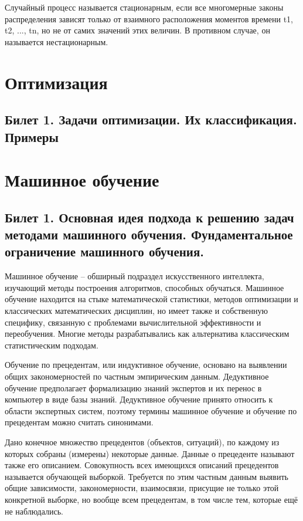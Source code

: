 \documentclass[a4paper, 12pt]{article}
\begin{document}
	Случайный процесс называется стационарным, если все многомерные законы распределения зависят только от взаимного расположения моментов
	времени t1, t2, ..., tn, но не от самих значений этих величин. В противном случае, он называется нестационарным.
	
	\section*{Оптимизация}
	\subsection*{Билет 1. Задачи оптимизации. Их классификация. Примеры}
	\section*{Машинное обучение}
	\subsection*{Билет 1. Основная идея подхода к решению задач методами машинного обучения. Фундаментальное ограничение машинного обучения.}
	Машинное обучение -- обширный подраздел искусственного интеллекта, изучающий методы построения алгоритмов, способных обучаться. Машинное обучение находится на стыке математической статистики, методов оптимизации и классических математических дисциплин, но имеет также и собственную специфику, связанную с проблемами вычислительной эффективности и переобучения. Многие методы разрабатывались как альтернатива классическим статистическим подходам. 
	
	Обучение по прецедентам, или индуктивное обучение, основано на выявлении общих закономерностей по частным эмпирическим данным. Дедуктивное обучение предполагает формализацию знаний экспертов и их перенос в компьютер в виде базы знаний. Дедуктивное обучение принято относить к области экспертных систем, поэтому термины машинное обучение и обучение по прецедентам можно считать синонимами.
	
	Дано конечное множество прецедентов (объектов, ситуаций), по каждому из которых собраны (измерены) некоторые данные. Данные о прецеденте называют также его описанием. Совокупность всех имеющихся описаний прецедентов называется обучающей выборкой. Требуется по этим частным данным выявить общие зависимости, закономерности, взаимосвязи, присущие не только этой конкретной выборке, но вообще всем прецедентам, в том числе тем, которые ещё не наблюдались.
	
\end{document}
